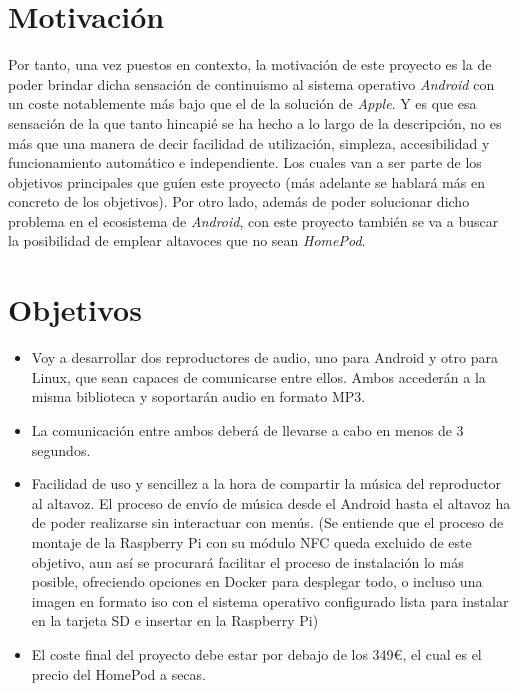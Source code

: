 \section{Motivación}
Por tanto, una vez puestos en contexto, la motivación de este proyecto es la de poder brindar dicha sensación de continuismo al sistema operativo \emph{Android} con un coste notablemente más bajo que el de la solución de \emph{Apple}. Y es que esa sensación de la que tanto hincapié se ha hecho a lo largo de la descripción, no es más que una manera de decir facilidad de utilización, simpleza, accesibilidad y funcionamiento automático e independiente. Los cuales van a ser parte de los objetivos principales que guíen este proyecto (más adelante se hablará más en concreto de los objetivos). Por otro lado, además de poder solucionar dicho problema en el ecosistema de \emph{Android}, con este proyecto también se va a buscar la posibilidad de emplear altavoces que no sean \emph{HomePod}. 

\section{Objetivos}
\begin{itemize}
    \item Voy a desarrollar dos reproductores de audio, uno para Android y otro para Linux, que sean capaces de comunicarse entre ellos. Ambos accederán a la misma biblioteca y soportarán audio en formato MP3.
    \item La comunicación entre ambos deberá de llevarse a cabo en menos de 3 segundos.
    \item Facilidad de uso y sencillez a la hora de compartir la música del reproductor al altavoz. El proceso de envío de música desde el Android hasta el altavoz ha de poder realizarse sin interactuar con menús. (Se entiende que el proceso de montaje de la Raspberry Pi con su módulo NFC queda excluido de este objetivo, aun así se procurará facilitar el proceso de instalación lo más posible, ofreciendo opciones en Docker para desplegar todo, o incluso una imagen en formato iso con el sistema operativo configurado lista para instalar en la tarjeta SD e insertar en la Raspberry Pi)
    \item El coste final del proyecto debe estar por debajo de los 349€, el cual es el precio del HomePod a secas.
\end{itemize}

